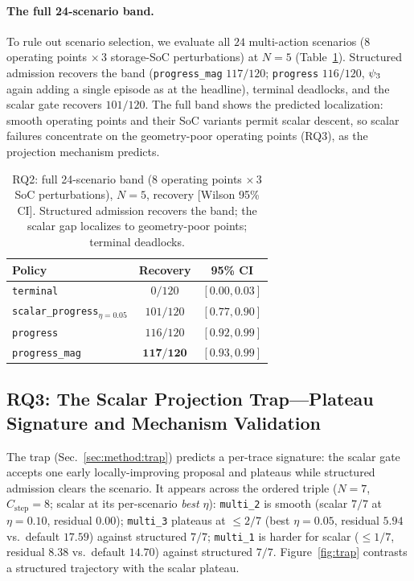 \paragraph{The full 24-scenario band.}
To rule out scenario selection, we evaluate all $24$ multi-action scenarios ($8$ operating points $\times\,3$ storage-SoC perturbations) at $N{=}5$ (Table~\ref{tab:band24}). Structured admission recovers the band (\texttt{progress\_mag} $117/120$; \texttt{progress} $116/120$, $\psi_3$ again adding a single episode as at the headline), terminal deadlocks, and the scalar gate recovers $101/120$. The full band shows the predicted localization: smooth operating points and their SoC variants permit scalar descent, so scalar failures concentrate on the geometry-poor operating points (RQ3), as the projection mechanism predicts.

\begin{table}[tb]
\centering
\caption{RQ2: full 24-scenario band ($8$ operating points $\times\,3$ SoC perturbations), $N{=}5$, recovery [Wilson 95\% CI]. Structured admission recovers the band; the scalar gap localizes to geometry-poor points; terminal deadlocks.}
\label{tab:band24}
\footnotesize
\begin{tabular*}{\textwidth}{@{\extracolsep{\fill}}lcc}
\toprule
Policy & Recovery & 95\% CI \\
\midrule
\texttt{terminal}                            & $0/120$  & $[0.00,0.03]$ \\
\texttt{scalar\_progress}$_{\eta=0.05}$      & $101/120$ & $[0.77,0.90]$ \\
\texttt{progress}                            & $116/120$ & $[0.92,0.99]$ \\
\texttt{progress\_mag}                       & $\mathbf{117/120}$ & $\mathbf{[0.93,0.99]}$ \\
\bottomrule
\end{tabular*}
\end{table}

\subsection{RQ3: The Scalar Projection Trap---Plateau Signature and Mechanism Validation}
\label{sec:eval:rq3}

The trap (Sec.~\ref{sec:method:trap}) predicts a per-trace signature: the scalar gate accepts one early locally-improving proposal and plateaus while structured admission clears the scenario. It appears across the ordered triple ($N{=}7$, $C_{\text{step}}{=}8$; scalar at its per-scenario \emph{best} $\eta$): \texttt{multi\_2} is smooth (scalar $7/7$ at $\eta{=}0.10$, residual $0.00$); \texttt{multi\_3} plateaus at $\le2/7$ (best $\eta{=}0.05$, residual $5.94$ vs.\ default $17.59$) against structured $7/7$; \texttt{multi\_1} is harder for scalar ($\le1/7$, residual $8.38$ vs.\ default $14.70$) against structured $7/7$. Figure~\ref{fig:trap} contrasts a structured trajectory with the scalar plateau.

